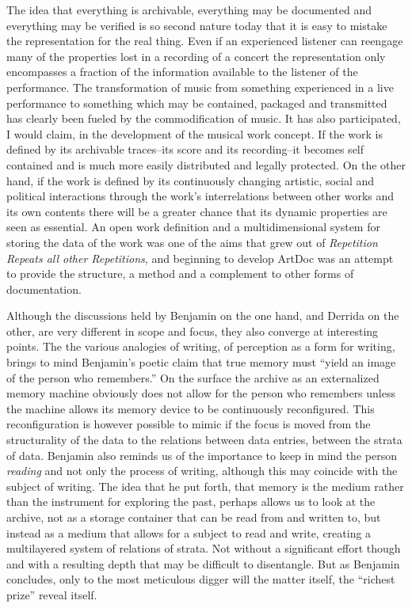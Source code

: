 \documentclass[11pt,a4paper]{article}
\begin{document}
The idea that everything is archivable, everything may be documented and everything may be verified is so second nature today that it is easy to mistake the representation for the real thing. Even if an experienced listener can reengage many of the properties lost in a recording of a concert the representation only encompasses a fraction of the information available to the listener of the performance. The transformation of music from something experienced in a live performance to something which may be contained, packaged and transmitted has clearly been fueled by the commodification of music. It has also participated, I would claim, in the development of the musical work concept. If the work is defined by its archivable traces--its score and its recording--it becomes self contained and is much more easily distributed and legally protected. On the other hand, if the work is defined by its continuously changing artistic, social and political interactions through the work's interrelations between other works and its own contents there will be a greater chance that its dynamic properties are seen as essential. An open work definition and a multidimensional system for storing the data of the work was one of the aims that grew out of \emph{Repetition Repeats all other Repetitions}, and beginning to develop ArtDoc was an attempt to provide the structure, a method and a complement to other forms of documentation.

Although the discussions held by Benjamin on the one hand, and Derrida on the other, are very different in scope and focus, they also converge at interesting points. The the various analogies of writing, of perception as a form for writing, brings to mind Benjamin's poetic claim that true memory must ``yield an image of the person who remembers.'' \citep[p. 576]{benjamin2005} On the surface the archive as an externalized memory machine obviously does not allow for the person who remembers unless the machine allows its memory device to be continuously reconfigured. This reconfiguration is however possible to mimic if the focus is moved from the structurality of the data to  the relations between data entries, between the strata of data. Benjamin also reminds us of the importance to keep in mind the person \emph{reading} and not only the process of writing, although this may coincide with the subject of writing. The idea that he put forth, that memory is the medium rather than the instrument for exploring the past, perhaps allows us to look at the archive, not as a storage container that can be read from and written to, but instead as a medium that allows for a subject to read and write, creating a multilayered system of relations of strata. Not without a significant effort though and with a resulting depth that may be difficult to disentangle. But as Benjamin concludes, only to the most meticulous digger will the matter itself, the ``richest prize'' \citep[p. 576]{benjamin2005} reveal itself.

\printbibliography
\end{document}
